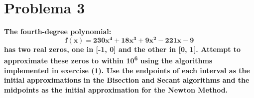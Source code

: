 \section*{Problema 3}
\textbf{The fourth-degree polynomial:}
\begin{equation*}
    \mathbf{f(x)= 230x^4+18x^3+9x^2-221x-9}
\end{equation*}
\textbf{has two real zeros, one in [-1, 0] and the other in [0, 1]. Attempt to approximate these zeros to within 10\textsuperscript{6} using the algorithms implemented in exercise (1). Use the endpoints of each interval as the initial approximations in the Bisection and Secant algorithms and the midpoints as the initial approximation for the Newton Method.}
